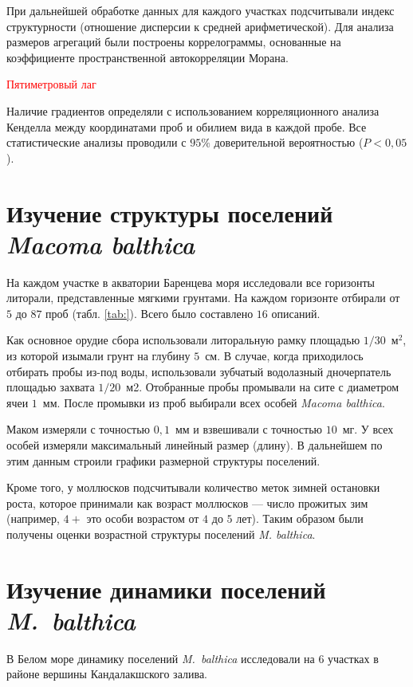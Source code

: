 \documentclass[12pt, a4paper]{disser}
\begin{document}
При дальнейшей обработке данных для каждого участках подсчитывали индекс структурности (отношение дисперсии к средней арифметической). 
Для анализа размеров агрегаций были построены коррелограммы, основанные на коэффициенте пространственной автокорреляции Морана.

\textcolor{red}{Пятиметровый лаг}

Наличие градиентов определяли с использованием корреляционного анализа Кенделла между координатами проб и обилием вида в каждой пробе. 
Все статистические анализы проводили с $95\%$ доверительной вероятностью ($P < 0,05$).


	
	\section{Изучение структуры поселений {\it Macoma balthica}}

  На каждом участке в акватории Баренцева моря исследовали все  горизонты литорали, представленные мягкими грунтами.  
На каждом горизонте отбирали от $5$ до $87$ проб  (табл.  \ref{tab:}). Всего было составлено $16$ описаний.

Как основное орудие сбора использовали литоральную рамку площадью $1/30$~м$^2$, из которой изымали грунт на глубину $5$~см. 
В случае, когда приходилось отбирать пробы из-под воды, использовали зубчатый водолазный дночерпатель площадью захвата $1/20$~м2.
Отобранные пробы промывали на сите с диаметром ячеи $1$~мм. 
После промывки из   проб   выбирали   всех   особей  {\it Macoma balthica}.

   Маком   измеряли  с точностью $0,1$~мм  и взвешивали с точностью $10$~мг.
 У всех особей измеряли максимальный линейный размер (длину). 
В дальнейшем по этим данным строили графики размерной структуры поселений. 

Кроме того, у моллюсков подсчитывали количество меток зимней остановки роста, которое принимали как возраст моллюсков ---­ число прожитых зим (например, $4+$ это  особи возрастом от $4$ до $5$ лет).   
Таким   образом   были   получены   оценки возрастной структуры поселений {\it M. balthica}.

	\section{Изучение динамики поселений {\it M.~balthica}}
В Белом море динамику поселений {\it M.~balthica} исследовали на $6$ участках в районе вершины Кандалакшского залива. 
\end{document}
